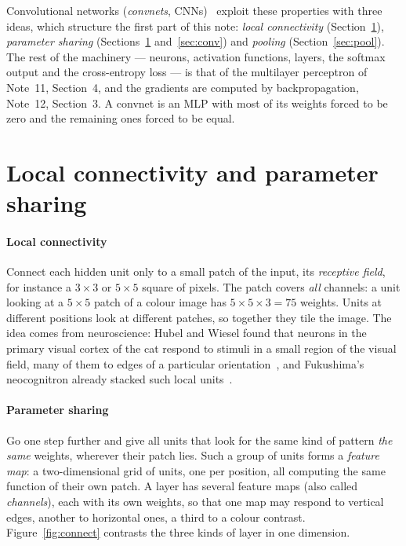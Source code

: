 \documentclass[11pt]{article}
\begin{document}
Convolutional networks (\emph{convnets}, CNNs)~\cite{lecun1989,lecun1998} exploit these properties with three ideas,
which structure the first part of this note: \emph{local connectivity} (Section~\ref{sec:sharing}), \emph{parameter
sharing} (Sections~\ref{sec:sharing} and~\ref{sec:conv}) and \emph{pooling} (Section~\ref{sec:pool}). The rest of the
machinery --- neurons, activation functions, layers, the softmax output and the cross-entropy loss --- is that of the
multilayer perceptron of Note~11, Section~4, and the gradients are computed by backpropagation, Note~12, Section~3. A convnet is an MLP with
most of its weights forced to be zero and the remaining ones forced to be equal.

\section{Local connectivity and parameter sharing}\label{sec:sharing}

\paragraph{Local connectivity} Connect each hidden unit only to a small patch of the input, its \emph{receptive
field}, for instance a $3 \times 3$ or $5 \times 5$ square of pixels. The patch covers \emph{all} channels: a unit looking
at a $5 \times 5$ patch of a colour image has $5 \times 5 \times 3 = 75$ weights. Units at different positions look at
different patches, so together they tile the image. The idea comes from neuroscience: Hubel and Wiesel found that
neurons in the primary visual cortex of the cat respond to stimuli in a small region of the visual field, many of them to
edges of a particular orientation~\cite{hubel1962}, and Fukushima's neocognitron already stacked such local
units~\cite{fukushima1980}.

\paragraph{Parameter sharing} Go one step further and give all units that look for the same kind of pattern \emph{the
same} weights, wherever their patch lies. Such a group of units forms a \emph{feature map}: a two-dimensional grid of
units, one per position, all computing the same function of their own patch. A layer has several feature maps (also
called \emph{channels}), each with its own weights, so that one map may respond to vertical edges, another to
horizontal ones, a third to a colour contrast. Figure~\ref{fig:connect} contrasts the three kinds of layer in one
dimension.
\end{document}
